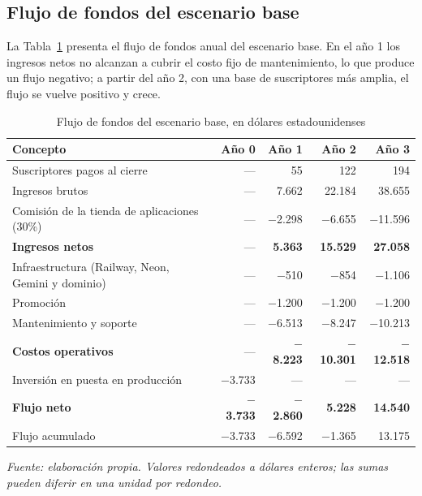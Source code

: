 \subsection{Flujo de fondos del escenario base}
\label{sec:viabilidad-flujo}

La Tabla~\ref{tab:viabilidad-flujo} presenta el flujo de fondos anual del escenario base. En el año 1 los ingresos netos no alcanzan a cubrir el costo fijo de mantenimiento, lo que produce un flujo negativo; a partir del año 2, con una base de suscriptores más amplia, el flujo se vuelve positivo y crece.

\begin{table}[!htbp]
\centering
\caption{Flujo de fondos del escenario base, en dólares estadounidenses}
\label{tab:viabilidad-flujo}
\renewcommand{\arraystretch}{1.3}
\footnotesize
\setlength{\tabcolsep}{4pt}
\begin{tabular}{|m{5.4cm}|r|r|r|r|}
\hline
\textbf{Concepto} & \textbf{Año 0} & \textbf{Año 1} & \textbf{Año 2} & \textbf{Año 3} \\
\hline
Suscriptores pagos al cierre & --- & 55 & 122 & 194 \\
\hline
Ingresos brutos & --- & 7.662 & 22.184 & 38.655 \\
\hline
Comisión de la tienda de aplicaciones (30\%) & --- & $-$2.298 & $-$6.655 & $-$11.596 \\
\hline
\textbf{Ingresos netos} & --- & \textbf{5.363} & \textbf{15.529} & \textbf{27.058} \\
\hline
Infraestructura (Railway, Neon, Gemini y dominio) & --- & $-$510 & $-$854 & $-$1.106 \\
\hline
Promoción & --- & $-$1.200 & $-$1.200 & $-$1.200 \\
\hline
Mantenimiento y soporte & --- & $-$6.513 & $-$8.247 & $-$10.213 \\
\hline
\textbf{Costos operativos} & --- & \textbf{$-$8.223} & \textbf{$-$10.301} & \textbf{$-$12.518} \\
\hline
Inversión en puesta en producción & $-$3.733 & --- & --- & --- \\
\hline
\textbf{Flujo neto} & \textbf{$-$3.733} & \textbf{$-$2.860} & \textbf{5.228} & \textbf{14.540} \\
\hline
Flujo acumulado & $-$3.733 & $-$6.592 & $-$1.365 & 13.175 \\
\hline
\end{tabular}

\smallskip
\noindent\textit{Fuente: elaboración propia. Valores redondeados a dólares enteros; las sumas pueden diferir en una unidad por redondeo.}
\end{table}

